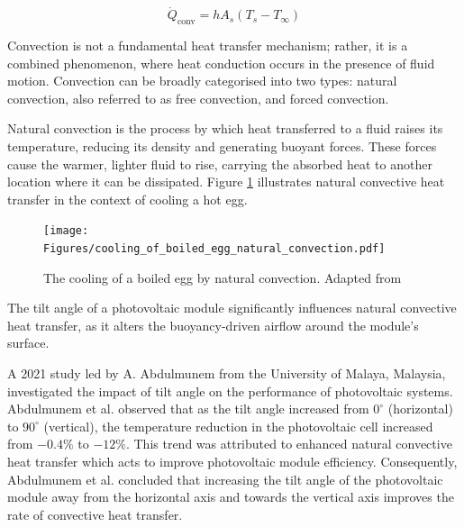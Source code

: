 \begin{equation}
    \dot{Q}_\text{conv} = hA_s(T_s-T_\infty)
    \label{eq:rate_of_convective_heat_transfer_function}
\end{equation}

Convection is not a fundamental heat transfer mechanism; rather, it is a combined phenomenon, where heat conduction occurs in the presence of fluid motion. Convection can be broadly categorised into two types: natural convection, also referred to as free convection, and forced convection. \cite{Cengel2014FundamentalsConvection}

Natural convection is the process by which heat transferred to a fluid raises its temperature, reducing its density and generating buoyant forces. These forces cause the warmer, lighter fluid to rise, carrying the absorbed heat to another location where it can be dissipated. \cite{Zohuri2020ThermosyphonApplications} Figure \ref{fig:cooling_of_boiled_egg_natural_convection} illustrates natural convective heat transfer in the context of cooling a hot egg.

\begin{figure}[ht]
    \centering
    \texttt{[image: Figures/cooling\_of\_boiled\_egg\_natural\_convection.pdf]}
    \caption{The cooling of a boiled egg by natural convection. Adapted from \cite{Cengel2014IntroductionConcepts}}
    \label{fig:cooling_of_boiled_egg_natural_convection}
\end{figure}

The tilt angle of a photovoltaic module significantly influences natural convective heat transfer, as it alters the buoyancy-driven airflow around the module’s surface.\vspace{0.5em}


A 2021 study led by A. Abdulmunem from the University of Malaya, Malaysia, investigated the impact of tilt angle on the performance of photovoltaic systems. Abdulmunem et al. observed that as the tilt angle increased from $0^\circ$ (horizontal) to $90^\circ$ (vertical), the temperature reduction in the photovoltaic cell increased from $-0.4\%$ to $-12\%$. This trend was attributed to enhanced natural convective heat transfer which acts to improve photovoltaic module efficiency. Consequently, Abdulmunem et al. concluded that increasing the tilt angle of the photovoltaic module away from the horizontal axis and towards the vertical axis improves the rate of convective heat transfer. \cite{Abdulmunem2021NumericalSink}\vspace{0.5em}

